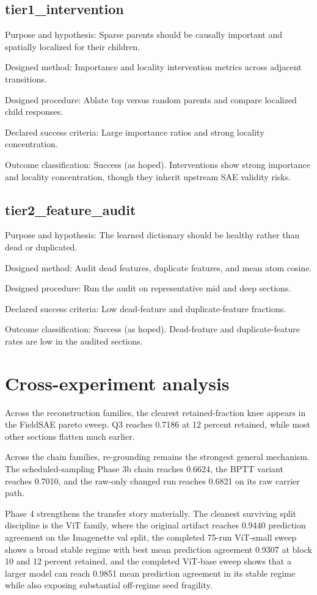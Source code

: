 \documentclass[11pt]{article}
\begin{document}
\subsection{tier1\_intervention}
Purpose and hypothesis: Sparse parents should be causally important and spatially localized for their children.


Designed method: Importance and locality intervention metrics across adjacent transitions.


Designed procedure: Ablate top versus random parents and compare localized child responses.


Declared success criteria: Large importance ratios and strong locality concentration.


Outcome classification: Success (as hoped). Interventions show strong importance and locality concentration, though they inherit upstream SAE validity risks.


\subsection{tier2\_feature\_audit}
Purpose and hypothesis: The learned dictionary should be healthy rather than dead or duplicated.


Designed method: Audit dead features, duplicate features, and mean atom cosine.


Designed procedure: Run the audit on representative mid and deep sections.


Declared success criteria: Low dead-feature and duplicate-feature fractions.


Outcome classification: Success (as hoped). Dead-feature and duplicate-feature rates are low in the audited sections.


\section{Cross-experiment analysis}
Across the reconstruction families, the clearest retained-fraction knee appears in the FieldSAE pareto sweep. Q3 reaches 0.7186 at 12 percent retained, while most other sections flatten much earlier.


Across the chain families, re-grounding remains the strongest general mechanism. The scheduled-sampling Phase 3b chain reaches 0.6624, the BPTT variant reaches 0.7010, and the raw-only changed run reaches 0.6821 on its raw carrier path.


Phase 4 strengthens the transfer story materially. The cleanest surviving split discipline is the ViT family, where the original artifact reaches 0.9440 prediction agreement on the Imagenette val split, the completed 75-run ViT-small sweep shows a broad stable regime with best mean prediction agreement 0.9307 at block 10 and 12 percent retained, and the completed ViT-base sweep shows that a larger model can reach 0.9851 mean prediction agreement in its stable regime while also exposing substantial off-regime seed fragility.
\end{document}

